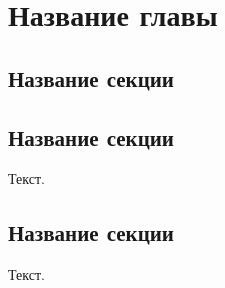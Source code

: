 
\chapter{Название главы}
\label{chap3}

\section{Название секции}
\label{chap3:sec1}

\section{Название секции}
\label{chap3:sec2}

Текст.

\section{Название секции}
\label{chap3:sec3}

Текст.


